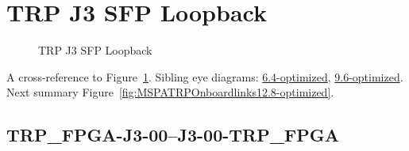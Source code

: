

% 

\section{TRP J3 SFP Loopback}\label{sec:TRPJ3SFPLoopback12.8-optimized}

\begin{figure}[h] %
\begin{subfigure}{1\textwidth}
\hyperref[sec:TRPFPGAJ300J300TRPFPGA12.8-optimized]{}
\end{subfigure}

\caption{TRP J3 SFP Loopback} \label{fig:TRPJ3SFPLoopback12.8-optimized}
\end{figure}

A cross-reference to Figure~\ref{fig:TRPJ3SFPLoopback12.8-optimized}.
Sibling eye diagrams: \hyperref[sec:TRPJ3SFPLoopback6.4-optimized]{6.4-optimized}, \hyperref[sec:TRPJ3SFPLoopback9.6-optimized]{9.6-optimized}. \\
Next summary Figure~\ref{fig:MSPATRPOnboardlinks12.8-optimized}.
\clearpage
% 
\subsection{TRP\_FPGA-J3-00--J3-00-TRP\_FPGA}\label{sec:TRPFPGAJ300J300TRPFPGA12.8-optimized}


